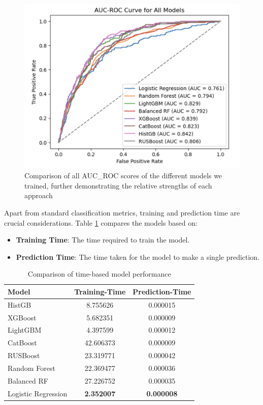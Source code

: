 \documentclass[12pt,letterpaper]{article}
\begin{document}
\begin{figure}[H]
    \centering
    \includegraphics[width=\textwidth]
    {figure/auc_roc_all_models.png}
    \caption{Comparison of all AUC\_ROC scores of the different models we trained, further demonstrating the relative strengths of each approach}
    \label{fig:auc_roc_all}
\end{figure}

Apart from standard classification metrics, training and prediction time are crucial considerations. Table \ref{tab:time_performance} compares the models based on:

\begin{itemize}
    \item \textbf{Training Time}: The time required to train the model.
    \item \textbf{Prediction Time}: The time taken for the model to make a single prediction.
\end{itemize}

\begin{table}[H]
    \centering
    \begin{tabular}{|l|c|c|}
        \hline
        Model & Training-Time & Prediction-Time\\
        \hline

        HistGB & 8.755626 & 0.000015 \\
        XGBoost & 5.682351 & 0.000009 \\
        LightGBM & 4.397599 & 0.000012 \\
        CatBoost & 42.606373 & 0.000009 \\
        RUSBoost & 23.319771 & 0.000042 \\
        Random Forest & 22.369477 & 0.000036 \\
        Balanced RF & 27.226752 & 0.000035 \\
        Logistic Regression & \textbf{2.352007} & \textbf{0.000008} \\
        \hline
    \end{tabular}
    \caption{Comparison of time-based model performance}
    \label{tab:time_performance}
\end{table}
\end{document}
